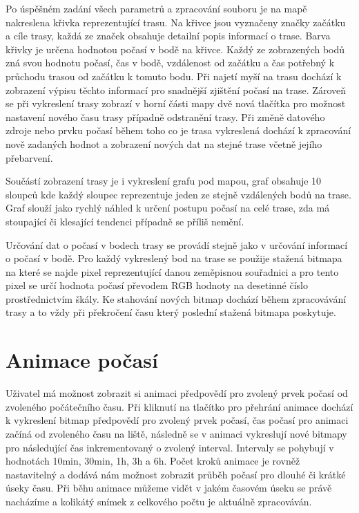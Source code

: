 \documentclass[czech,bachelor,dept460,male,csharp,cpdeclaration]{diploma}
\begin{document}
	Po úspěšném zadání všech parametrů a zpracování souboru je na mapě nakreslena křivka reprezentující trasu. Na křivce jsou vyznačeny značky začátku a cíle trasy, každá ze značek obsahuje detailní popis informací o trase. Barva křivky je určena hodnotou počasí v bodě na křivce. Každý ze zobrazených bodů zná svou hodnotu počasí, čas v bodě, vzdálenost od začátku a čas potřebný k průchodu trasou od začátku k tomuto bodu. Při najetí myší na trasu dochází k zobrazení výpisu těchto informací pro snadnější zjištění počasí na trase. Zároveň se při vykreslení trasy zobrazí v horní části mapy dvě nová tlačítka pro možnost nastavení nového času trasy případně odstranění trasy. Při změně datového zdroje nebo prvku počasí během toho co je trasa vykreslená dochází k zpracování nově zadaných hodnot a zobrazení nových dat na stejné trase včetně jejího přebarvení.
	
	Součástí zobrazení trasy je i vykreslení grafu pod mapou, graf obsahuje 10 sloupců kde každý sloupec reprezentuje jeden ze stejně vzdálených bodů na trase. Graf slouží jako rychlý náhled k určení postupu počasí na celé trase, zda má stoupající či klesající tendenci případně se příliš nemění.
	
	Určování dat o počasí v bodech trasy se provádí stejně jako v určování informací o počasí v bodě. Pro každý vykreslený bod na trase se použije stažená bitmapa na které se najde pixel reprezentující danou zeměpisnou souřadnici a pro tento pixel se určí hodnota počasí převodem RGB hodnoty na desetinné číslo prostřednictvím škály. Ke stahování nových bitmap dochází během zpracovávání trasy a to vždy při překročení času který poslední stažená bitmapa poskytuje.
	
	\section{Animace počasí}
	
	Uživatel má možnost zobrazit si animaci předpovědí pro zvolený prvek počasí od zvoleného počátečního času. Při kliknutí na tlačítko pro přehrání animace dochází k vykreslení bitmap předpovědí pro zvolený prvek počasí, čas počasí pro animaci začíná od zvoleného času na liště, následně se v animaci vykreslují nové bitmapy pro následující čas inkrementovaný o zvolený interval. Intervaly se pohybují v hodnotách 10min, 30min, 1h, 3h a 6h. Počet kroků animace je rovněž nastavitelný a dodává nám možnost zobrazit průběh počasí pro dlouhé či krátké úseky času. Při běhu animace můžeme vidět v jakém časovém úseku se právě nacházíme a kolikátý snímek z celkového počtu je aktuálně zpracováván.
	
\end{document}
